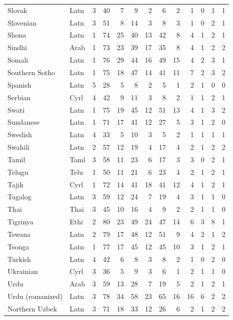 \begin{small}
\begin{longtable}{llrrrrrrrrrrr}
Slovak & Latn & 3 & 40 & 7 & 9 & 2 & 6 & 2 & 1 & 0 & 1 & 1 \\
Slovenian & Latn & 3 & 51 & 8 & 14 & 3 & 8 & 3 & 1 & 0 & 2 & 1 \\
Shona & Latn & 1 & 74 & 25 & 40 & 13 & 42 & 8 & 4 & 1 & 2 & 1 \\
Sindhi & Arab & 1 & 73 & 23 & 39 & 17 & 35 & 8 & 4 & 1 & 2 & 2 \\
Somali & Latn & 1 & 76 & 29 & 44 & 16 & 49 & 15 & 4 & 2 & 3 & 1 \\
Southern Sotho & Latn & 1 & 75 & 18 & 47 & 14 & 41 & 11 & 7 & 2 & 3 & 2 \\
Spanish & Latn & 5 & 28 & 5 & 8 & 2 & 5 & 1 & 2 & 1 & 0 & 0 \\
Serbian & Cyrl & 4 & 42 & 9 & 11 & 3 & 8 & 2 & 1 & 1 & 2 & 1 \\
Swati & Latn & 1 & 75 & 19 & 45 & 12 & 51 & 13 & 4 & 1 & 3 & 2 \\
Sundanese & Latn & 1 & 71 & 17 & 41 & 12 & 27 & 5 & 3 & 1 & 2 & 0 \\
Swedish & Latn & 4 & 33 & 5 & 10 & 3 & 5 & 2 & 1 & 1 & 1 & 1 \\
Swahili & Latn & 2 & 57 & 12 & 19 & 4 & 17 & 4 & 2 & 1 & 2 & 2 \\
Tamil & Taml & 3 & 58 & 11 & 23 & 6 & 17 & 3 & 3 & 0 & 2 & 1 \\
Telugu & Telu & 1 & 50 & 11 & 21 & 6 & 23 & 4 & 2 & 1 & 2 & 1 \\
Tajik & Cyrl & 1 & 72 & 14 & 41 & 18 & 41 & 12 & 4 & 1 & 2 & 1 \\
Tagalog & Latn & 3 & 59 & 12 & 24 & 7 & 19 & 4 & 3 & 1 & 1 & 0 \\
Thai & Thai & 3 & 45 & 10 & 16 & 4 & 9 & 2 & 2 & 1 & 1 & 0 \\
Tigrinya & Ethi & 2 & 80 & 23 & 49 & 24 & 47 & 14 & 6 & 3 & 8 & 1 \\
Tswana & Latn & 2 & 79 & 17 & 48 & 12 & 51 & 9 & 4 & 2 & 1 & 2 \\
Tsonga & Latn & 1 & 77 & 17 & 45 & 12 & 45 & 10 & 3 & 1 & 2 & 1 \\
Turkish & Latn & 4 & 42 & 6 & 8 & 3 & 8 & 2 & 1 & 0 & 2 & 0 \\
Ukrainian & Cyrl & 3 & 36 & 5 & 9 & 3 & 6 & 1 & 2 & 1 & 1 & 0 \\
Urdu & Arab & 3 & 59 & 13 & 28 & 7 & 19 & 5 & 2 & 1 & 2 & 1 \\
Urdu (romanized) & Latn & 3 & 78 & 34 & 58 & 23 & 65 & 16 & 16 & 6 & 2 & 2 \\
Northern Uzbek & Latn & 3 & 71 & 18 & 33 & 12 & 26 & 6 & 2 & 1 & 2 & 2 \\

\end{longtable}
\end{small}
